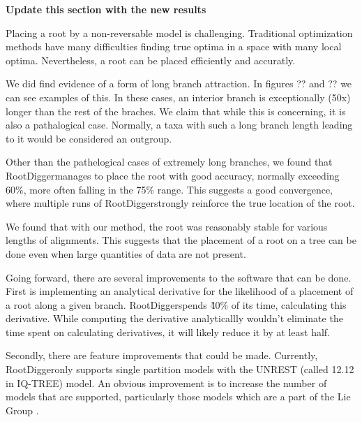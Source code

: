 \documentclass{article}
\newcommand{\RootDigger}{RootDigger}
\newcommand{\BenComment}[1]{{\bf \color{blue} {#1}}}
\begin{document}
\BenComment{Update this section with the new results}

Placing a root by a non-reversable model is challenging. Traditional
optimization methods have many difficulties finding true optima in a space with
many local optima. Nevertheless, a root can be placed efficiently and accuratly.

We did find evidence of a form of long branch attraction. In figures
?? and ?? we can see examples of this. In these
cases, an interior branch is exceptionally (50x) longer than the rest of the
braches. We claim that while this is concerning, it is also a pathalogical case.
Normally, a taxa with such a long branch length leading to it would be
considered an outgroup.

Other than the pathelogical cases of extremely long branches, we found that
\RootDigger manages to place the root with good accuracy, normally exceeding
60\%, more often falling in the 75\% range. This suggests a good convergence,
where multiple runs of \RootDigger strongly reinforce the true location of the
root.

We found that with our method, the root was reasonably stable for various
lengths of alignments. This suggests that the placement of a root on a tree can
be done even when large quantities of data are not present.

Going forward, there are several improvements to the software that can be done.
First is implementing an analytical derivative for the likelihood of a placement
of a root along a given branch. \RootDigger spends \~ 40\% of its time,
calculating this derivative. While computing the derivative analyticallly
wouldn't eliminate the time spent on calculating derivatives, it will likely
reduce it by at least half.

Secondly, there are feature improvements that could be made. Currently,
\RootDigger only supports single partition models with the UNREST (called 12.12
in IQ-TREE) model. An obvious improvement is to increase the number of models
that are supported, particularly those models which are a part of the Lie Group
\cite{woodhams_new_2015}.



\end{document}
